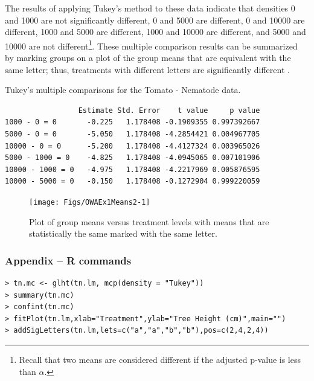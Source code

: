 \documentclass[10pt,openany]{book}\usepackage[]{graphicx}\usepackage[]{color}
\makeatletter
\newenvironment{kframe}{%
 \def\at@end@of@kframe{}%
 \ifinner\ifhmode%
  \def\at@end@of@kframe{\end{minipage}}%
  \begin{minipage}{\columnwidth}%
 \fi\fi%
 \def\FrameCommand##1{\hskip\@totalleftmargin \hskip-\fboxsep
 \colorbox{shadecolor}{##1}\hskip-\fboxsep
     \hskip-\linewidth \hskip-\@totalleftmargin \hskip\columnwidth}%
 \MakeFramed {\advance\hsize-\width
   \@totalleftmargin\z@ \linewidth\hsize
   \@setminipage}}%
 {\par\unskip\endMakeFramed%
 \at@end@of@kframe}
\newenvironment{knitrout}{}{} %
\makeatother
\begin{document}
The results of applying Tukey's method to these data  indicate that densities 0 and 1000 are not significantly different, 0 and 5000 are different, 0 and 10000 are different, 1000 and 5000 are different, 1000 and 10000 are different, and 5000 and 10000 are not different\footnote{Recall that two means are considered different if the adjusted p-value is less than $\alpha$.}.  These multiple comparison results can be summarized by marking groups on a plot of the group means that are equivalent with the same letter; thus, treatments with different letters are significantly different .

\begin{table}[h]
  \centering
  \caption{Tukey's multiple comparisons for the Tomato - Nematode data.}\label{tab:OWAEx1HSD}
\begin{knitrout}
\color{fgcolor}\begin{kframe}
\begin{verbatim}
                 Estimate Std. Error    t value     p value
1000 - 0 = 0       -0.225   1.178408 -0.1909355 0.997392667
5000 - 0 = 0       -5.050   1.178408 -4.2854421 0.004967705
10000 - 0 = 0      -5.200   1.178408 -4.4127324 0.003965026
5000 - 1000 = 0    -4.825   1.178408 -4.0945065 0.007101906
10000 - 1000 = 0   -4.975   1.178408 -4.2217969 0.005876595
10000 - 5000 = 0   -0.150   1.178408 -0.1272904 0.999220059
\end{verbatim}
\end{kframe}
\end{knitrout}
\end{table}

\begin{knitrout}
\color{fgcolor}\begin{figure}[hbtp]

{\centering \texttt{[image: Figs/OWAEx1Means2-1]} 

}

\caption[Plot of group means versus treatment levels with means that are statistically the same marked with the same letter]{Plot of group means versus treatment levels with means that are statistically the same marked with the same letter.}\label{fig:OWAEx1Means2}
\end{figure}


\end{knitrout}

\subsubsection*{Appendix -- R commands}
\begin{Verbatim}[formatcom=\color{red},xleftmargin=5mm,commandchars=\\\{\}]
> tn.mc <- glht(tn.lm, mcp(density = "Tukey"))
> summary(tn.mc)
> confint(tn.mc)
> fitPlot(tn.lm,xlab="Treatment",ylab="Tree Height (cm)",main="")
> addSigLetters(tn.lm,lets=c("a","a","b","b"),pos=c(2,4,2,4))
\end{Verbatim}
\end{document}
